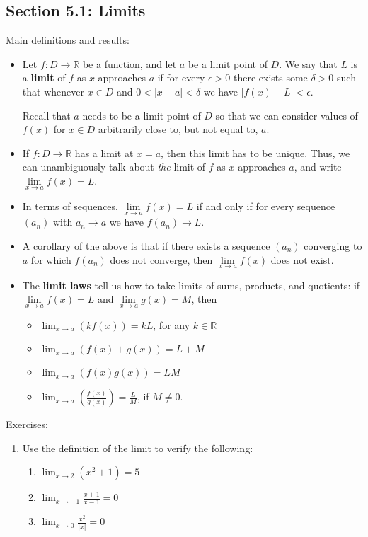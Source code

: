 \documentclass[letterpaper,12pt]{article}
\newcommand{\R}{\mathbb{R}}
\newcommand{\abs}[1]{\lvert #1\rvert}
\begin{document}
\subsection*{Section 5.1: Limits}
Main definitions and results:
\begin{itemize}
 \item Let $f:D\to \R$ be a function, and let $a$ be a limit point of $D$. We say that $L$ is a {\bf limit} of $f$ as $x$ approaches $a$ if for every $\epsilon>0$ there exists some $\delta>0$ such that whenever $x\in D$ and $0<\abs{x-a}<\delta$ we have $\abs{f(x)-L}<\epsilon$.

Recall that $a$ needs to be a limit point of $D$ so that we can consider values of $f(x)$ for $x\in D$ arbitrarily close to, but not equal to, $a$.
 \item If $f:D\to\R$ has a limit at $x=a$, then this limit has to be unique. Thus, we can unambiguously talk about {\em the} limit of $f$ as $x$ approaches $a$, and write $\lim\limits_{x\to a}f(x)=L$.
 \item In terms of sequences, $\lim\limits_{x\to a}f(x)=L$ if and only if for every sequence $(a_n)$ with $a_n\to a$ we have $f(a_n)\to L$.
 \item A corollary of the above is that if there exists a sequence $(a_n)$ converging to $a$ for which $f(a_n)$ does not converge, then $\lim\limits_{x\to a}f(x)$ does not exist.
 \item The {\bf limit laws} tell us how to take limits of sums, products, and quotients: if $\lim\limits_{x\to a}f(x)=L$ and $\lim\limits_{x\to a}g(x)=M$, then
\begin{itemize}
 \item $\displaystyle \lim_{x\to a}(kf(x)) = kL$, for any $k\in \R$
 \item $\displaystyle \lim_{x\to a}(f(x)+g(x)) = L+M$
 \item $\displaystyle \lim_{x\to a}(f(x)g(x)) = LM$
 \item $\displaystyle \lim_{x\to a}\left(\frac{f(x)}{g(x)}\right) = \frac{L}{M}$, if $M\neq 0$.
\end{itemize}

\end{itemize}

\noindent Exercises:
\begin{enumerate}
 \item Use the definition of the limit to verify the following:
\begin{enumerate}
 \item $\displaystyle \lim_{x\to 2}(x^2+1)=5$
 \item $\displaystyle \lim_{x\to -1}\frac{x+1}{x-1}=0$
 \item $\displaystyle \lim_{x\to 0}\frac{x^2}{\abs{x}}=0$
\end{enumerate}

\end{enumerate}
\end{document}
